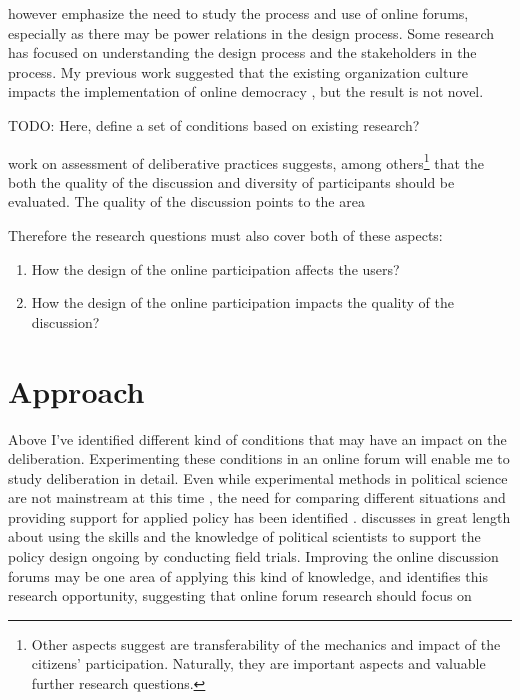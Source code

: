 \documentclass[journal,a4paper]{IEEEtran}
\begin{document}
 however emphasize the need to study the process and use of online forums, especially as there may be power relations in the design process.  Some research has focused on understanding the design process and the stakeholders in the process. My previous work suggested that the existing organization culture impacts the implementation of online democracy \cite{nelimarkka11}, but the result is not novel.

TODO: Here, define a set of conditions based on existing research?

 work on assessment of deliberative practices suggests, among others\footnote{Other aspects  suggest are transferability of the mechanics and impact of the citizens' participation. Naturally, they are important aspects and valuable further research questions.} that the both the quality of the discussion and diversity of participants should be evaluated. The quality of the discussion points to the area

Therefore the research questions must also cover both of these aspects:

\begin{enumerate}
\item How the design of the online participation affects the users?
\item How the design of the online participation impacts the quality of the discussion?
\end{enumerate}

\section{Approach}

Above I've identified different kind of conditions that may have an impact on the deliberation. Experimenting these conditions in an online forum will enable me to study deliberation in detail. Even while experimental methods in political science are not mainstream at this time \cite{green03}, the need for comparing different situations and providing support for applied policy has been identified \cite{stoker10}.  discusses in great length about using the skills and the knowledge of political scientists to support the policy design ongoing by conducting field trials. Improving the online discussion forums may be one area of applying this kind of knowledge, and  identifies this research opportunity, suggesting that online forum research should focus on
\end{document}
